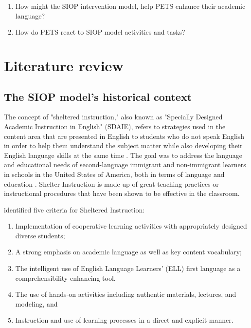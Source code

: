 \documentclass[english]{textolivre}
\begin{document}
\begin{enumerate}
    \item How might the SIOP intervention model, help PETS enhance their academic language?
    \item How do PETS react to SIOP model activities and tasks?
\end{enumerate}

\section{Literature review}\label{sec-normas}
\subsection{The SIOP model's historical context}
The concept of "sheltered instruction," also known as "Specially Designed Academic Instruction in English" (SDAIE), refers to strategies used in the content area that are presented in English to students who do not speak English in order to help them understand the subject matter while also developing their English language skills at the same time \cite{hansen-thomas_sheltered_2008,crawford_impact_2008}. The goal was to address the language and educational needs of second-language immigrant and non-immigrant learners in schools in the United States of America, both in terms of language and education \cite{echevarria_making_2008,echevarria_siop_2010,hansen-thomas_sheltered_2008}. Shelter Instruction is made up of great teaching practices or instructional procedures that have been shown to be effective in the classroom.

\textcite{hansen-thomas_sheltered_2008} identified five criteria for Sheltered Instruction:

\begin{enumerate}
    \item Implementation of cooperative learning activities with appropriately designed diverse students;
    \item A strong emphasis on academic language as well as key content vocabulary;
    \item The intelligent use of English Language Learners' (ELL) first language as a comprehensibility-enhancing tool.
    \item The use of hands-on activities including authentic materials, lectures, and modeling, and
    \item Instruction and use of learning processes in a direct and explicit manner.
\end{enumerate}
\end{document}
